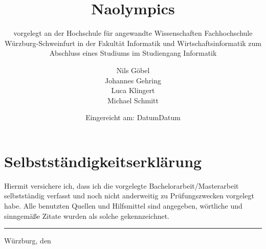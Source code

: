 \documentclass[12pt,a4paper,DIV13,pdftex,BCOR10mm,fleqn,liststotoc,bibtotoc,cleardoubleempty]{scrbook}
\begin{document}
\frontmatter
\titlehead{%
  {Hochschule f\"{u}r angewandte Wissenschaften\\
   Fachhochschule W\"{u}rzburg-Schweinfurt\\
   Fakult\"{a}t Informatik und Wirtschaftsinformatik}}
\subject{Projektarbeit}
\title{Naolympics\\[10mm]}
\subtitle{\normalsize{vorgelegt an der Hochschule f\"{u}r angewandte Wissenschaften Fachhochschule W\"{u}rzburg-Schweinfurt in der Fakult\"{a}t Informatik und Wirtschaftsinformatik zum Abschluss eines Studiums im Studiengang Informatik}}
\author{Nils G\"obel\\Johannes Gehring\\Luca Klingert\\Michael Schmitt}
\date{\normalsize{Eingereicht am: Datum}}
\publishers{
  \normalsize{Erstpr\"{u}fer: Prof. Dr. Arndt Balzer} \\
  \normalsize{Zweitpr\"{u}fer: Prof. Dr. Daniel Kulesz}\\
}


\maketitle

\thispagestyle{empty}
\section*{Selbstständigkeitserklärung}
Hiermit versichere ich, dass ich die vorgelegte Bachelorarbeit/Masterarbeit selbstst\"{a}ndig verfasst und noch nicht anderweitig zu Pr\"{u}fungszwecken vorgelegt habe. Alle benutzten Quellen und Hilfsmittel sind angegeben, w\"{o}rtliche und sinngem\"{a}{\ss}e Zitate wurden als solche gekennzeichnet.\\[15mm]
\vspace{20mm}
\hrule
\vspace{5mm}
W\"urzburg, den \date{Datum}

\cleardoublepage     %

\nonfrenchspacing
\renewcommand{\figurename}{Abb.}
\renewcommand{\tablename}{Tab.}

\tableofcontents %
\listoffigures %
\listoftables
\end{document}
